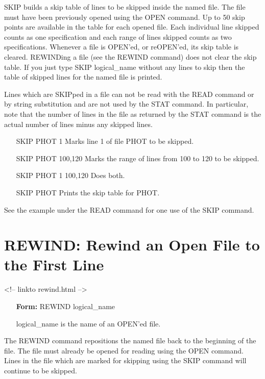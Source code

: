 SKIP builds a skip table of lines to be skipped inside the named file.  The
file must have been previously opened using the OPEN command.  Up to 50
skip points are available in the table for each opened file.  Each
individual line skipped counts as one specification and each range of lines
skipped counts as two specifications.  Whenever a file is OPEN'ed, or
reOPEN'ed, its skip table is cleared.  REWINDing a file (see the REWIND
command) does not clear the skip table.  If you just type SKIP
logical\_name without any lines to skip then the table of skipped lines for
the named file is printed.

Lines which are SKIPped in a file can not be read with the READ command or
by string substitution and are not used by the STAT command.  In
particular, note that the number of lines in the file as returned by the
STAT command is the actual number of lines minus any skipped lines.

\begin{itemize}
  \item[SKIP PHOT 1]{Marks line 1 of file PHOT to be skipped.}
  \item[SKIP PHOT 100,120]{Marks the range of lines from 100 to 120 to 
       be skipped.}
  \item[SKIP PHOT 1 100,120]{Does both.}
  \item[SKIP PHOT]{Prints the skip table for PHOT.}
\end{itemize}
See the example under the READ command for one use of the SKIP command.

\section{REWIND: Rewind an Open File to the First Line}
\begin{rawhtml}
<!-- linkto rewind.html -->
\end{rawhtml}
\begin{itemize}
  \item[\textbf{Form: }REWIND logical\_name\hfill]{}
  \item[logical\_name]{is the name of an OPEN'ed file.}
\end{itemize}

The REWIND command repositions the named file back to the beginning of the
file.  The file must already be opened for reading using the OPEN command.
Lines in the file which are marked for skipping using the SKIP command will
continue to be skipped.

